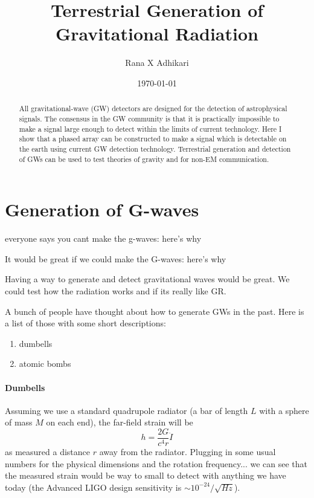\documentclass[aps,prd,twocolumn,showpacs,superscriptaddress,groupedaddress]{revtex4-2}  %
\begin{document}
\title{Terrestrial Generation of Gravitational Radiation}
\author{Rana X Adhikari}
\date{\today}


\begin{abstract}
All gravitational-wave (GW) detectors are designed for the detection of astrophysical
signals.
The consensus in the GW community is that it is practically impossible to make a signal large enough to detect within the limits of current technology.
Here I show that a phased array can be constructed to make a signal which is detectable on the earth using current GW detection technology.
Terrestrial generation and detection of GWs can be used to test theories of gravity and for non-EM communication.
\end{abstract}

\maketitle

\tableofcontents



\section{Generation of G-waves}
everyone says you cant make the g-waves: here's why

It would be great if we could make the G-waves: here's why

Having a way to generate and detect gravitational waves would be great.
We could test how the radiation works and if its really like GR.

A bunch of people have thought about how to generate GWs in the past. Here is
a list of those with some short descriptions:
\begin{enumerate}
\item dumbells
\item atomic bombs
\end{enumerate}

\paragraph{Dumbells}
Assuming we use a standard quadrupole radiator (a bar of length $L$ with
a sphere of mass $M$ on each end), the far-field strain will be
\begin{equation}
h = \frac{2 G}{c^4 r} \ddot{I}
\end{equation}
as measured a distance $r$ away from the radiator.
Plugging in some usual numbers for the physical dimensions and the rotation
frequency...
we can see that the measured strain would be way to small to detect with
anything we have today (the Advanced LIGO design sensitivity is
$\sim 10^{-24} / \sqrt{Hz}$).
\end{document}
